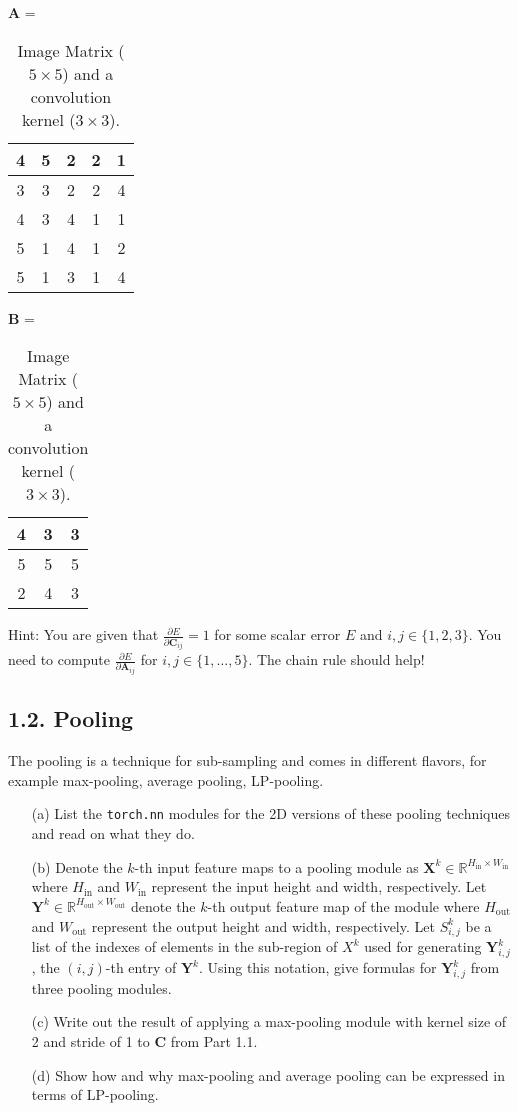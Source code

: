 \documentclass[12pt,letterpaper]{article}
\newcommand{\matr}[1]{\bm{#1}}     %
\begin{document}
\begin{table}[!ht]
    \centering
    $\matr{A}$ =  \begin{tabular}{|c|c|c|c|c|} 
    \hline
       4 & 5 & 2 & 2 & 1 \\ \hline 
       3 & 3 & 2 & 2 & 4 \\ \hline
       4 & 3 & 4 & 1 & 1 \\ \hline 
       5 & 1 & 4 & 1 & 2 \\ \hline
       5 & 1 & 3 & 1 & 4 \\ \hline
    \end{tabular}\hspace{1cm}
    $\matr{B}$ = \begin{tabular}{|c|c|c|} 
    \hline
       4 & 3 & 3 \\ \hline 
       5 & 5 & 5 \\ \hline
       2 & 4 & 3 \\ \hline 
    \end{tabular}
    \caption{Image Matrix ($5\times 5$) and a convolution kernel ($3\times 3$).}
    \label{tab1}
   
\end{table}
 Hint: You are given that $\frac{\partial E}{\partial \matr{C}_{ij}} = 1$ for some scalar error $E$ and $i,j\in\{1,2,3\}$. You need to compute $\frac{\partial E}{\partial \matr{A}_{ij}}$ for  $i,j\in\{1, \ldots, 5\}$. The chain rule should help!
\newpage
\subsection*{1.2. Pooling}
The pooling is a technique for sub-sampling and comes in different flavors, for example max-pooling, average pooling, LP-pooling. 
\begin{itemize}
    \item[(a)] List the \texttt{torch.nn} modules for the 2D versions of these pooling techniques and read on what they do.
    \item[(b)] Denote the $k$-th input feature maps to a pooling module as $\matr{X}^k \in \mathbb{R}^{H_{\textrm{in}}\times W_{\textrm{in}}} $ where $H_{\textrm{in}}$ and $W_{\text{in}}$ represent the input height and width, respectively. Let $\matr{Y}^k \in \mathbb{R}^{H_{\text{out}}\times W_{\textrm{out}}}$ denote the $k$-th output feature map of the module where $H_{\textrm{out}}$ and $W_{\textrm{out}}$ represent the output height and width, respectively. Let $S^{k}_{i,j}$ be a list of the indexes of elements in the sub-region of $X^k $ used for generating $\matr{Y}^k_{i,j}$, the $(i,j)$-th entry of $\matr{Y}^{k}$. 
    Using this notation, give formulas for $\matr{Y}^k_{i,j} $ from three pooling modules.
    \item[(c)] Write out the result of applying a max-pooling module with kernel size of 2 and stride of 1 to $\matr{C}$ from Part 1.1.
    \item[(d)] Show how and why max-pooling and average pooling can be expressed in terms of LP-pooling.
\end{itemize}
\end{document}
